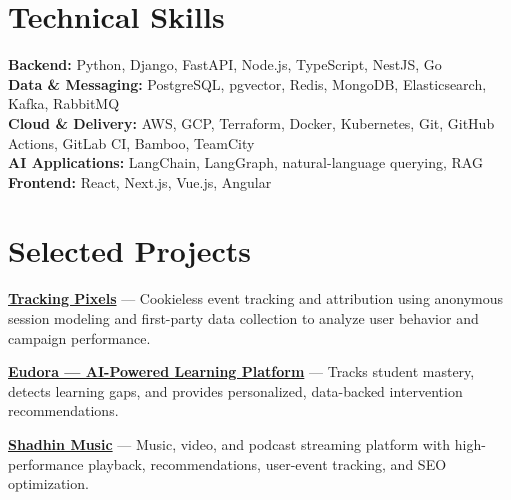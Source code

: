 \documentclass[10pt,a4paper]{article}
\begin{document}
\section*{Technical Skills}
\textbf{Backend:} Python, Django, FastAPI, Node.js, TypeScript, NestJS, Go\\
\textbf{Data \& Messaging:} PostgreSQL, pgvector, Redis, MongoDB, Elasticsearch, Kafka, RabbitMQ\\
\textbf{Cloud \& Delivery:} AWS, GCP, Terraform, Docker, Kubernetes, Git, GitHub Actions, GitLab CI, Bamboo, TeamCity\\
\textbf{AI Applications:} LangChain, LangGraph, natural-language querying, RAG\\
\textbf{Frontend:} React, Next.js, Vue.js, Angular

\section*{Selected Projects}
\href{https://github.com/Shibly-Noman/a-tracking-pixel}{\textbf{Tracking Pixels}} --- Cookieless event tracking and attribution using anonymous session modeling and first-party data collection to analyze user behavior and campaign performance.

\href{https://github.com/The-Digital-Dude/eudora_v2}{\textbf{Eudora --- AI-Powered Learning Platform}} --- Tracks student mastery, detects learning gaps, and provides personalized, data-backed intervention recommendations.

\href{https://shadhinmusic.com/}{\textbf{Shadhin Music}} --- Music, video, and podcast streaming platform with high-performance playback, recommendations, user-event tracking, and SEO optimization.
\end{document}
